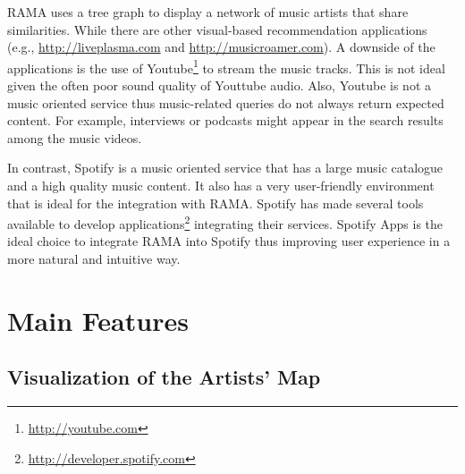 \documentclass{article}
\begin{document}
  RAMA uses a tree graph to display a network of music artists that share similarities.
  While there are other visual-based recommendation applications (e.g., \url{http://liveplasma.com} and \url{http://musicroamer.com}).
  A downside of the applications is the use of Youtube\footnote{\url{http://youtube.com}} to stream the music tracks.
  This is not ideal given the often poor sound quality of Youttube audio. Also, Youtube is not a music oriented service thus music-related queries do not always return expected content. For example, interviews or podcasts might appear in the search results among the music videos.

  In contrast, Spotify is a music oriented service that has a large music catalogue and a high quality music content.
  It also has a very user-friendly environment that is ideal for the integration with RAMA.
  Spotify has made several tools available to develop applications\footnote{\url{http://developer.spotify.com}} integrating their services.
  Spotify Apps is the ideal choice to integrate RAMA into Spotify thus improving user experience in a more natural and intuitive way.

  \section{Main Features}
  \label{sec:features}

    \subsection{Visualization of the Artists' Map}
    \label{sub:visualization}
\end{document}
